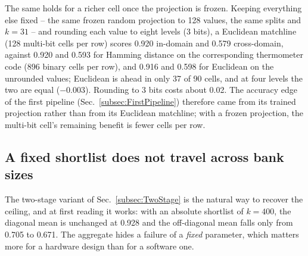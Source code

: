 The same holds for a richer cell once the projection is frozen.
Keeping everything else fixed -- the same frozen random projection to
128 values, the same splits and $k=31$ -- and rounding each value to
eight levels (3 bits), a Euclidean matchline (128 multi-bit cells per
row) scores 0.920 in-domain and 0.579 cross-domain, against 0.920 and
0.593 for Hamming distance on the corresponding thermometer code (896
binary cells per row), and 0.916 and 0.598 for Euclidean on the
unrounded values; Euclidean is ahead in only 37 of 90 cells, and at
four levels the two are equal ($-0.003$). Rounding to 3 bits costs
about 0.02. The accuracy edge of the first pipeline
(Sec.~\ref{subsec:FirstPipeline}) therefore came from its trained
projection rather than from its Euclidean matchline; with a frozen
projection, the multi-bit cell's remaining benefit is fewer cells per
row.


\subsection{A fixed shortlist does not travel across bank sizes}
\label{subsec:Shortlist}
The two-stage variant of Sec.~\ref{subsec:TwoStage} is the natural way
to recover the ceiling, and at first reading it works: with an absolute
shortlist of $k=400$, the diagonal mean is unchanged at 0.928 and the
off-diagonal mean falls only from 0.705 to 0.671. The aggregate hides a
failure of a \emph{fixed} parameter, which matters more for a hardware
design than for a software one.

